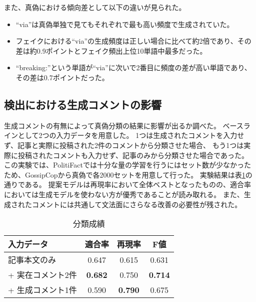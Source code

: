 また、真偽における傾向差として以下の違いが見られた。

\begin{itemize}
    \item ``via''は真偽単独で見てもそれぞれで最も高い頻度で生成されていた。
    \item フェイクにおける``via''の生成頻度は正しい場合に比べて約2倍であり、その差は約0.9ポイントとフェイク頻出上位10単語中最多だった。
    \item ``breaking:''という単語が``via''に次いで2番目に頻度の差が高い単語であり、その差は0.7ポイントだった。
\end{itemize}

\subsection{検出における生成コメントの影響}
生成コメントの有無によって真偽分類の結果に影響が出るか調べた。
ベースラインとして2つの入力データを用意した。
1つは生成されたコメントを入力せず、記事と実際に投稿された2件のコメントから分類させた場合、
もう1つは実際に投稿されたコメントも入力せず、記事のみから分類させた場合であった。
この実験では、PolitiFactでは十分な量の学習を行うにはセット数が少なかったため、GossipCopから真偽で各2000セットを用意して行った。
実験結果は表\ref{tbl:classify_results}の通りである。
提案モデルは再現率において全体ベストとなったものの、適合率においては生成モデルを使わない方が優秀であることが読み取れる。
また、生成されたコメントには共通して文法面にさらなる改善の必要性が残された。

\begin{table}[!t]
    \renewcommand{\arraystretch}{1.3}
    \caption{分類成績}
    \label{tbl:classify_results}
    \centering
    \begin{tabular}{lccc}
        \hline
        入力データ           & 適合率 & 再現率 & F値 \\ \hline
        記事本文のみ         & 0.647     & 0.615  & 0.631    \\
        + 実在コメント2件  & \textbf{0.682}     & 0.750  & \textbf{0.714}    \\
        + 生成コメント1件 & 0.590     & \textbf{0.790}  & 0.675    \\ \hline
    \end{tabular}
\end{table}
